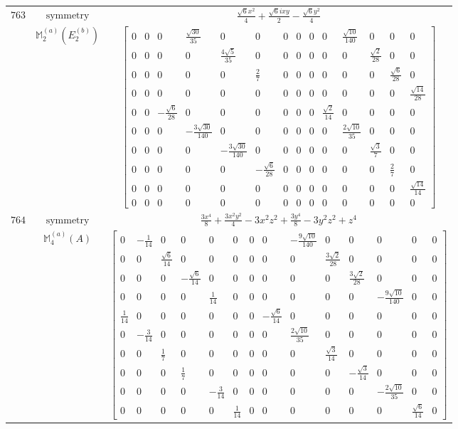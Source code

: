 \documentclass[fleqn,8pt,landscape]{jsarticle}
\begin{document}
\begin{longtable}{ccc}
$ 763 $ & $ \text{symmetry} $ & $ \frac{\sqrt{6} x^{2}}{4} + \frac{\sqrt{6} i x y}{2} - \frac{\sqrt{6} y^{2}}{4} $ \\
$  $ & $ \mathbb{M}_{2}^{(a)}(E_{2}^{(b)}) $ & $ \begin{bmatrix} 0 & 0 & 0 & \frac{\sqrt{30}}{35} & 0 & 0 & 0 & 0 & 0 & 0 & \frac{\sqrt{10}}{140} & 0 & 0 & 0 \\ 0 & 0 & 0 & 0 & \frac{4 \sqrt{5}}{35} & 0 & 0 & 0 & 0 & 0 & 0 & \frac{\sqrt{2}}{28} & 0 & 0 \\ 0 & 0 & 0 & 0 & 0 & \frac{2}{7} & 0 & 0 & 0 & 0 & 0 & 0 & \frac{\sqrt{6}}{28} & 0 \\ 0 & 0 & 0 & 0 & 0 & 0 & 0 & 0 & 0 & 0 & 0 & 0 & 0 & \frac{\sqrt{14}}{28} \\ 0 & 0 & - \frac{\sqrt{6}}{28} & 0 & 0 & 0 & 0 & 0 & 0 & \frac{\sqrt{2}}{14} & 0 & 0 & 0 & 0 \\ 0 & 0 & 0 & - \frac{3 \sqrt{30}}{140} & 0 & 0 & 0 & 0 & 0 & 0 & \frac{2 \sqrt{10}}{35} & 0 & 0 & 0 \\ 0 & 0 & 0 & 0 & - \frac{3 \sqrt{30}}{140} & 0 & 0 & 0 & 0 & 0 & 0 & \frac{\sqrt{3}}{7} & 0 & 0 \\ 0 & 0 & 0 & 0 & 0 & - \frac{\sqrt{6}}{28} & 0 & 0 & 0 & 0 & 0 & 0 & \frac{2}{7} & 0 \\ 0 & 0 & 0 & 0 & 0 & 0 & 0 & 0 & 0 & 0 & 0 & 0 & 0 & \frac{\sqrt{14}}{14} \\ 0 & 0 & 0 & 0 & 0 & 0 & 0 & 0 & 0 & 0 & 0 & 0 & 0 & 0 \end{bmatrix} $ \\ \hline
$ 764 $ & $ \text{symmetry} $ & $ \frac{3 x^{4}}{8} + \frac{3 x^{2} y^{2}}{4} - 3 x^{2} z^{2} + \frac{3 y^{4}}{8} - 3 y^{2} z^{2} + z^{4} $ \\
$  $ & $ \mathbb{M}_{4}^{(a)}(A) $ & $ \begin{bmatrix} 0 & - \frac{1}{14} & 0 & 0 & 0 & 0 & 0 & 0 & - \frac{9 \sqrt{10}}{140} & 0 & 0 & 0 & 0 & 0 \\ 0 & 0 & \frac{\sqrt{6}}{14} & 0 & 0 & 0 & 0 & 0 & 0 & \frac{3 \sqrt{2}}{28} & 0 & 0 & 0 & 0 \\ 0 & 0 & 0 & - \frac{\sqrt{6}}{14} & 0 & 0 & 0 & 0 & 0 & 0 & \frac{3 \sqrt{2}}{28} & 0 & 0 & 0 \\ 0 & 0 & 0 & 0 & \frac{1}{14} & 0 & 0 & 0 & 0 & 0 & 0 & - \frac{9 \sqrt{10}}{140} & 0 & 0 \\ \frac{1}{14} & 0 & 0 & 0 & 0 & 0 & 0 & - \frac{\sqrt{6}}{14} & 0 & 0 & 0 & 0 & 0 & 0 \\ 0 & - \frac{3}{14} & 0 & 0 & 0 & 0 & 0 & 0 & \frac{2 \sqrt{10}}{35} & 0 & 0 & 0 & 0 & 0 \\ 0 & 0 & \frac{1}{7} & 0 & 0 & 0 & 0 & 0 & 0 & \frac{\sqrt{3}}{14} & 0 & 0 & 0 & 0 \\ 0 & 0 & 0 & \frac{1}{7} & 0 & 0 & 0 & 0 & 0 & 0 & - \frac{\sqrt{3}}{14} & 0 & 0 & 0 \\ 0 & 0 & 0 & 0 & - \frac{3}{14} & 0 & 0 & 0 & 0 & 0 & 0 & - \frac{2 \sqrt{10}}{35} & 0 & 0 \\ 0 & 0 & 0 & 0 & 0 & \frac{1}{14} & 0 & 0 & 0 & 0 & 0 & 0 & \frac{\sqrt{6}}{14} & 0 \end{bmatrix} $ \\ \hline

\end{longtable}
\end{document}
